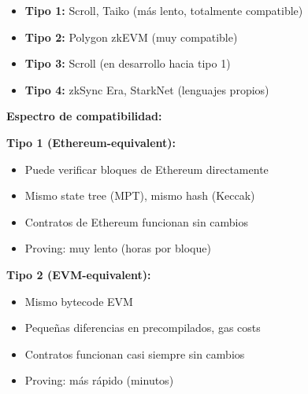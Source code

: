 \documentclass[11pt,a4paper,twoside]{book}
\begin{document}
\begin{itemize}
    \item \textbf{Tipo 1:} Scroll, Taiko (m\'as lento, totalmente compatible)
    \item \textbf{Tipo 2:} Polygon zkEVM (muy compatible)
    \item \textbf{Tipo 3:} Scroll (en desarrollo hacia tipo 1)
    \item \textbf{Tipo 4:} zkSync Era, StarkNet (lenguajes propios)
\end{itemize}

\begin{mathnote}
\textbf{Espectro de compatibilidad:}

\begin{center}
\end{center}

\textbf{Tipo 1 (Ethereum-equivalent):}
\begin{itemize}
    \item Puede verificar bloques de Ethereum directamente
    \item Mismo state tree (MPT), mismo hash (Keccak)
    \item Contratos de Ethereum funcionan sin cambios
    \item Proving: muy lento (horas por bloque)
\end{itemize}

\textbf{Tipo 2 (EVM-equivalent):}
\begin{itemize}
    \item Mismo bytecode EVM
    \item Peque\~nas diferencias en precompilados, gas costs
    \item Contratos funcionan casi siempre sin cambios
    \item Proving: m\'as r\'apido (minutos)
\end{itemize}


\end{mathnote}
\end{document}
